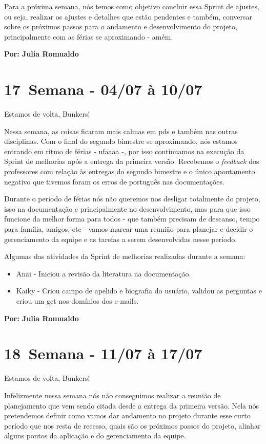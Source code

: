 Para a próxima semana, nós temos como objetivo concluir essa \gls{Sprint} de ajustes, ou seja, realizar os ajustes e detalhes que estão pendentes e também, conversar sobre os próximos passos para o andamento e desenvolvimento do projeto, principalmente com as férias se aproximando - amém.

\textbf{Por: Julia Romualdo}

\section{17\textordfeminine \, Semana - 04/07 à 10/07}
Estamos de volta, Bunkers!

Nessa semana, as coisas ficaram mais calmas em \acs{pds} e também nas outras disciplinas. Com o final do segundo bimestre se aproximando, nós estamos entrando em ritmo de férias - ufaaaa -, por isso continuamos na execução da \gls{Sprint} de melhorias após a entrega da primeira versão. Recebemos o \textit{feedback} dos professores com relação às entregas do segundo bimestre e o único apontamento negativo que tivemos foram os erros de português nas documentações. 

Durante o período de férias nós não queremos nos desligar totalmente do projeto, isso na documentação e principalmente no desenvolvimento, mas para que isso funcione da melhor forma para todos - que também precisam de descanso, tempo para família, amigos, etc - vamos marcar uma reunião para planejar e decidir o gerenciamento da equipe e as tarefas a serem desenvolvidas nesse período.

Algumas das atividades da \gls{Sprint} de melhorias realizadas durante a semana:
\begin{itemize}
    \item Anai - Iniciou a revisão da literatura na documentação.
    \item Kaiky - Criou campo de apelido e biografia do usuário, validou as perguntas e criou um get nos domínios dos e-mails.
\end{itemize}

\textbf{Por: Julia Romualdo}

\section{18\textordfeminine \, Semana - 11/07 à 17/07}
Estamos de volta, Bunkers!

Infelizmente nessa semana nós não conseguimos realizar a reunião de planejamento que vem sendo citada desde a entrega da primeira versão. Nela nós pretendemos definir como vamos dar andamento no projeto durante esse curto período que nos resta de recesso, quais são os próximos passos do projeto, alinhar alguns pontos da aplicação e do gerenciamento da equipe. 

